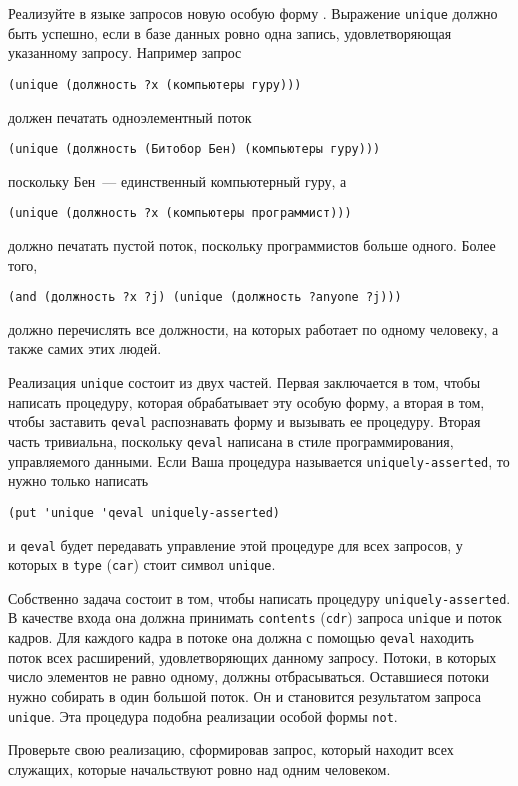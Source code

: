 \begin{exercise}{4.75}%
\label{EX4.75}%
Реализуйте в языке запросов новую особую форму
. Выражение 
{\tt unique} должно быть успешно, 
если в базе данных ровно одна запись, удовлетворяющая указанному
запросу. Например запрос

\begin{Verbatim}[fontsize=\small]
(unique (должность ?x (компьютеры гуру)))
\end{Verbatim}
должен печатать одноэлементный поток

\begin{Verbatim}[fontsize=\small]
(unique (должность (Битобор Бен) (компьютеры гуру)))
\end{Verbatim}
поскольку Бен~--- единственный компьютерный гуру, а

\begin{Verbatim}[fontsize=\small]
(unique (должность ?x (компьютеры программист)))
\end{Verbatim}
должно печатать пустой поток, поскольку программистов больше одного.
Более того,

\begin{Verbatim}[fontsize=\small]
(and (должность ?x ?j) (unique (должность ?anyone ?j)))
\end{Verbatim}
должно перечислять все должности, на которых работает по одному
человеку, а также самих этих людей.

Реализация {\tt unique} состоит из двух частей.
Первая заключается в том, чтобы написать процедуру, которая обрабатывает
эту особую форму, а вторая в том, чтобы заставить {\tt qeval}
распознавать форму и вызывать ее процедуру.  Вторая часть тривиальна,
поскольку {\tt qeval} написана в стиле программирования,
управляемого данными.  Если Ваша процедура называется
{\tt uniquely-asserted}, то нужно только написать

\begin{Verbatim}[fontsize=\small]
(put 'unique 'qeval uniquely-asserted)
\end{Verbatim}
и {\tt qeval} будет передавать управление этой процедуре для
всех запросов, у которых в {\tt type} ({\tt car}) стоит
символ {\tt unique}.

Собственно задача состоит в том, чтобы написать процедуру
{\tt uniquely-asserted}.  В качестве входа она должна принимать
{\tt contents} ({\tt cdr}) запроса {\tt unique} и
поток кадров.  Для каждого кадра в потоке она должна с помощью
{\tt qeval} находить поток всех расширений, удовлетворяющих
данному запросу.  Потоки, в которых число элементов не равно одному,
должны отбрасываться.  Оставшиеся потоки нужно собирать в один большой
поток.  Он и становится результатом запроса {\tt unique}. Эта
процедура подобна реализации особой формы {\tt not}.

Проверьте свою реализацию, сформировав запрос, который
находит всех служащих, которые начальствуют ровно над одним
человеком.
\end{exercise}

